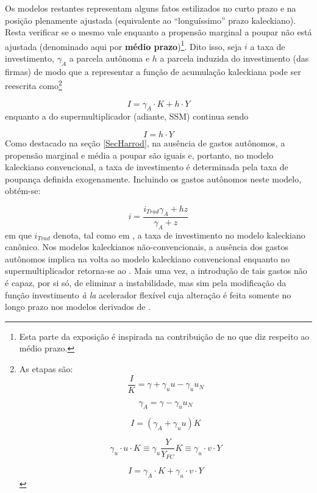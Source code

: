 Os modelos restantes representam alguns fatos estilizados no curto prazo e na posição plenamente ajustada (equivalente ao ``longuíssimo'' prazo kaleckiano). Resta verificar se o mesmo vale enquanto a propensão marginal a poupar não está ajustada (denominado aqui por  \textbf{médio prazo})\footnote{Esta parte da exposição é inspirada na contribuição de \textcite{fagundes_role_2017} no que diz respeito ao médio prazo.}. 
Dito isso, seja $i$ a taxa de investimento, $\gamma_A$ a parcela autônoma e $h$ a parcela induzida do investimento (das firmas) de modo que a representar a função de acumulação kaleckiana pode ser reescrita como\footnote{
	As etapas são:
	$$
	\frac{I}{K}  = \gamma + \gamma_uu - \gamma_uu_N
	$$
	
	$$
	\gamma_A = \gamma - \gamma_uu_N
	$$
	
	$$
	I = (\gamma_A + \gamma_uu)K
	$$
	
	$$
	\gamma_u\cdot u \cdot K \equiv \gamma_u\frac{Y}{Y_{FC}}K \equiv \gamma_u\cdot v\cdot Y
	$$
	
	$$
	I = \gamma_A\cdot K + \gamma_u\cdot v\cdot Y
	$$
}

\begin{equation}
\tag{kaleckiana}
I = \gamma_A\cdot K + h\cdot Y
\end{equation}
enquanto a do supermultiplicador (adiante, SSM) continua sendo

\begin{equation}
\tag{SSM}
I = h\cdot Y
\end{equation}
Como destacado na seção \ref{SecHarrod}, na ausência de gastos autônomos, a propensão marginal e média a poupar são iguais e, portanto, no modelo kaleckiano convencional, a taxa de investimento é determinada pela taxa de poupança definida exogenamente. Incluindo os gastos autônomos neste modelo, obtém-se:

$$
i = \frac{i_{Trad}\gamma_A + hz}{\gamma_A + z}
$$
em que $i_{Trad}$ denota, tal como em \textcite{fagundes_role_2017}, a taxa de investimento no modelo kaleckiano canônico. Nos modelos kaleckianos não-convencionais, a ausência dos gastos autônomos implica na volta ao modelo kaleckiano convencional enquanto no supermultiplicador retorna-se ao \textcite{harrod_essay_1939}. Mais uma vez, a introdução de tais gastos não é capaz, por si só, de eliminar a instabilidade, mas sim pela modificação da função investimento \textit{à la} acelerador flexível cuja alteração é feita somente no longo prazo nos modelos derivados de \textcite{allain_tackling_2015}. 


